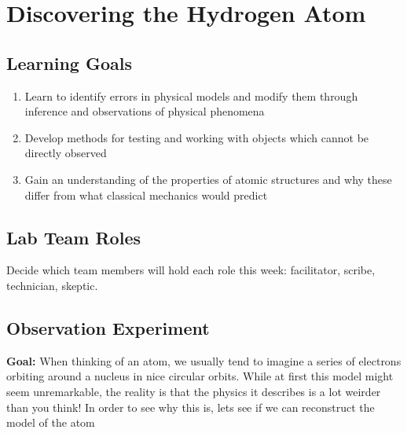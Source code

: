 \chapter{Discovering the Hydrogen Atom}

\section{Learning Goals}

\begin{enumerate}
	\item Learn to identify errors in physical models and modify them through inference and observations of physical phenomena
	
	\item Develop methods for testing and working with objects which cannot be directly observed
	
	\item Gain an understanding of the properties of atomic structures and why these differ from what classical mechanics would predict
\end{enumerate}

\section{Lab Team Roles}

Decide which team members will hold each role this week: facilitator, scribe, technician, skeptic.

\section{Observation Experiment} %

\textbf{Goal:} When thinking of an atom, we usually tend to imagine a series of electrons orbiting around a nucleus in nice circular orbits. While at first this model might seem unremarkable, the reality is that the physics it describes is a lot weirder than you think! In order to see why this is, lets see if we can reconstruct the model of the atom



